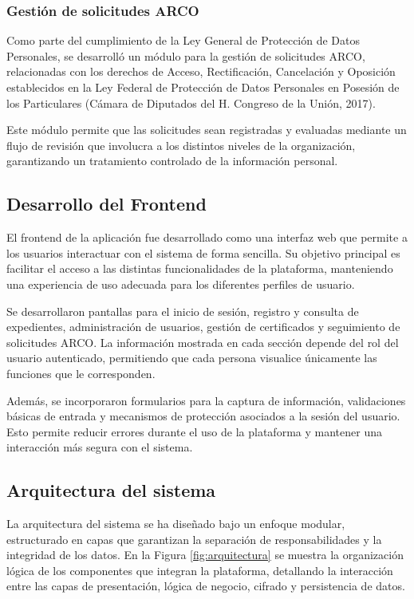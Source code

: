 \documentclass[10pt, letterpaper]{article}
\begin{document}
\subsubsection{Gestión de solicitudes ARCO}

Como parte del cumplimiento de la Ley General de Protección de Datos Personales, se desarrolló un módulo para la gestión de solicitudes ARCO, relacionadas con los derechos de Acceso, Rectificación, Cancelación y Oposición establecidos en la Ley Federal de Protección de Datos Personales en Posesión de los Particulares (Cámara de Diputados del H. Congreso de la Unión, 2017).

Este módulo permite que las solicitudes sean registradas y evaluadas mediante un flujo de revisión que involucra a los distintos niveles de la organización, garantizando un tratamiento controlado de la información personal.

\subsection{Desarrollo del Frontend}

El frontend de la aplicación fue desarrollado como una interfaz web que permite a los usuarios interactuar con el sistema de forma sencilla. Su objetivo principal es facilitar el acceso a las distintas funcionalidades de la plataforma, manteniendo una experiencia de uso adecuada para los diferentes perfiles de usuario.

Se desarrollaron pantallas para el inicio de sesión, registro y consulta de expedientes, administración de usuarios, gestión de certificados y seguimiento de solicitudes ARCO. La información mostrada en cada sección depende del rol del usuario autenticado, permitiendo que cada persona visualice únicamente las funciones que le corresponden.

Además, se incorporaron formularios para la captura de información, validaciones básicas de entrada y mecanismos de protección asociados a la sesión del usuario. Esto permite reducir errores durante el uso de la plataforma y mantener una interacción más segura con el sistema.

\subsection{Arquitectura del sistema}

La arquitectura del sistema se ha diseñado bajo un enfoque modular, estructurado en capas que garantizan la separación de responsabilidades y la integridad de los datos. En la Figura \ref{fig:arquitectura} se muestra la organización lógica de los componentes que integran la plataforma, detallando la interacción entre las capas de presentación, lógica de negocio, cifrado y persistencia de datos.
\end{document}
